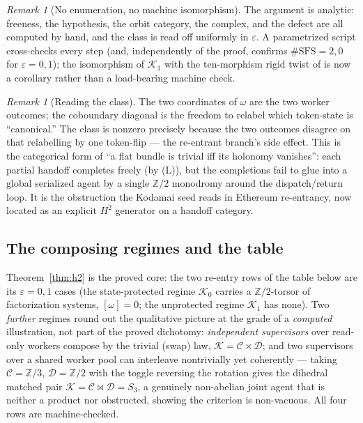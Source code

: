 \documentclass[11pt]{amsart}
\theoremstyle{definition}
\theoremstyle{remark}
\newtheorem{remark}[theorem]{Remark}
\newcommand{\C}{\mathcal{C}}
\newcommand{\D}{\mathcal{D}}
\newcommand{\K}{\mathcal{K}}
\begin{document}
\begin{remark}[No enumeration, no machine isomorphism]
The argument is analytic: freeness, the hypothesis, the orbit category, the complex, and the
defect are all computed by hand, and the class is read off uniformly in $\varepsilon$. A
parametrized script cross-checks every step (and, independently of the proof, confirms
$\#\mathrm{SFS}=2,0$ for $\varepsilon=0,1$); the isomorphism of $\K_1$ with the ten-morphism
rigid twist of \cite{gobstr} is now a corollary rather than a load-bearing machine check.
\end{remark}

\begin{remark}[Reading the class]
The two coordinates of $\omega$ are the two worker outcomes; the coboundary diagonal is the
freedom to relabel which token-state is ``canonical.'' The class is nonzero precisely because
the two outcomes disagree on that relabelling by one token-flip --- the re-entrant branch's
side effect. This is the categorical form of ``a flat bundle is trivial iff its holonomy
vanishes'': each partial handoff completes freely (by (L)), but the completions fail to glue
into a global serialized agent by a single $\mathbb Z/2$ monodromy around the dispatch/return
loop. It is the obstruction the Kodamai seed reads in Ethereum re-entrancy, now located as an
explicit $H^2$ generator on a handoff category.
\end{remark}

\subsection*{The composing regimes and the table}
Theorem~\ref{thm:h2} is the proved core: the two re-entry rows of the table below are its
$\varepsilon=0,1$ cases (the state-protected regime $\K_0$ carries a $\mathbb Z/2$-torsor of
factorization systems, $[\omega]=0$; the unprotected regime $\K_1$ has none). Two \emph{further}
regimes round out the qualitative picture at the grade of a \emph{computed} illustration, not
part of the proved dichotomy: \emph{independent supervisors} over read-only workers compose by
the trivial (swap) law, $\K=\C\times\D$; and two supervisors over a shared worker pool can
interleave nontrivially yet coherently --- taking $\C=\mathbb Z/3$, $\D=\mathbb Z/2$ with the
toggle reversing the rotation gives the dihedral matched pair $\K=\C\bowtie\D=S_3$, a genuinely
non-abelian joint agent that is neither a product nor obstructed, showing the criterion is
non-vacuous. All four rows are machine-checked.
\end{document}
